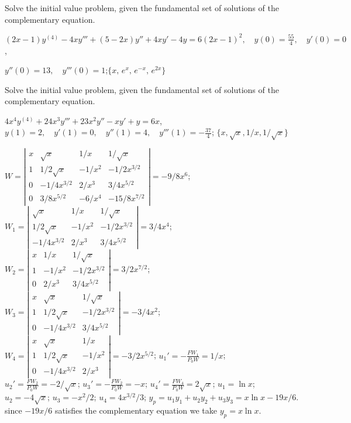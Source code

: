 \documentclass{ximera}
\begin{document}
\begin{problem}\label{exer:9.4.31}
Solve the
initial value problem, given the fundamental set of solutions of the complementary equation.

$(2x-1)y^{(4)}-4xy'''+(5-2x)y''+4xy'-4y=6(2x-1)^2, \quad  y(0)=\frac{55}{4},
\quad y'(0)=0$,

$y''(0)=13, \quad  y'''(0)=1$;\quad    $\{x,\,e^x,\,e^{-x},\,e^{2x}\}$
\end{problem}

\begin{problem}\label{exer:9.4.32}
Solve the
initial value problem, given the fundamental set of solutions of the complementary equation.

$4x^4y^{(4)}+24x^3y'''+23x^2y''-xy'+y=6x$,\quad $y(1)=2,\quad
y'(1)=0,\quad y''(1)=4,\quad y'''(1)=-\frac{37}{4}$;
\quad $\{x,\sqrt x,1/x,1/\sqrt x\}$

\begin{solution}
$W=\left|\begin{array}{cccc}
x&\sqrt{x}&1/x&1/\sqrt{x}\\
1&1/2\sqrt{x}&-1/x^2&-1/2x^{3/2}\\
0&-1/4x^{3/2}&2/x^3&3/4x^{5/2}\\
0&3/8x^{5/2}&-6/x^4&-15/8x^{7/2}
\end{array}\right|=-9/8x^6$;
$W_1=\left|\begin{array}{cccc}
\sqrt{x}&1/x&1/\sqrt{x}\\
1/2\sqrt{x}&-1/x^2&-1/2x^{3/2}\\
-1/4x^{3/2}&2/x^3&3/4x^{5/2}\end{array}\right|=3/4x^4$;
$W_2=\left|\begin{array}{cccc}
x&1/x&1/\sqrt{x}\\1&-1/x^2&-1/2x^{3/2}\\
0&2/x^3&3/4x^{5/2}\end{array}\right|=3/2x^{7/2}$;
$W_3=\left|\begin{array}{cccc}
x&\sqrt{x}&1/\sqrt{x}\\
1&1/2\sqrt{x}&-1/2x^{3/2}\\0&-1/4x^{3/2}&3/4x^{5/2}
\end{array}\right|=-3/4x^2$;
$W_4=\left|\begin{array}{cccc}
x&\sqrt{x}&1/x\\1&1/2\sqrt{x}&-1/x^2\\
0&-1/4x^{3/2}&2/x^3\end{array}\right|=-3/2x^{5/2}$;
$u_1'=-\frac{FW_1}{P_0W}=1/x$;
$u_2'=\frac{FW_2}{P_0W}=-2/\sqrt{x}$;
$u_3'=-\frac{FW_2}{P_0W}=-x$;
$u_4'=\frac{FW_4}{P_0W}=2\sqrt{x}$;
$u_1=\ln x$;
$u_2=-4\sqrt{x}$;
$u_3=-x^2/2$;
$u_4=4x^{3/2}/3$;
$y_p=u_1y_1+u_2y_2+u_3y_3= x\ln x-19x/6$.
since $-19x/6$ satisfies the complementary equation we take
$y_p=x\ln x$.


\end{solution}
\end{problem}
\end{document}
